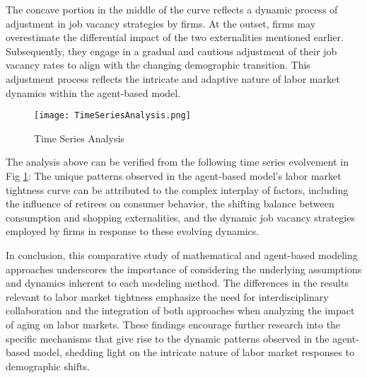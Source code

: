 \documentclass[ %
    final,
    scrbook,
    listoffigures,
    listoftables, 
    glossary]{cu-thesis}
\begin{document}
The concave portion in the middle of the curve reflects a dynamic process of adjustment in job vacancy strategies by firms. At the outset, firms may overestimate the differential impact of the two externalities mentioned earlier. Subsequently, they engage in a gradual and cautious adjustment of their job vacancy rates to align with the changing demographic transition. This adjustment process reflects the intricate and adaptive nature of labor market dynamics within the agent-based model.

\begin{figure}[h]
\centering
\texttt{[image: TimeSeriesAnalysis.png]}
\caption{Time Series Analysis}
\label{figTSA}
\end{figure}

The analysis above can be verified from the following time series evolvement in Fig \ref{figTSA}:
The unique patterns observed in the agent-based model's labor market tightness curve can be attributed to the complex interplay of factors, including the influence of retirees on consumer behavior, the shifting balance between consumption and shopping externalities, and the dynamic job vacancy strategies employed by firms in response to these evolving dynamics.

In conclusion, this comparative study of mathematical and agent-based modeling approaches underscores the importance of considering the underlying assumptions and dynamics inherent to each modeling method. The differences in the results relevant to labor market tightness emphasize the need for interdisciplinary collaboration and the integration of both approaches when analyzing the impact of aging on labor markets. These findings encourage further research into the specific mechanisms that give rise to the dynamic patterns observed in the agent-based model, shedding light on the intricate nature of labor market responses to demographic shifts.
\end{document}

